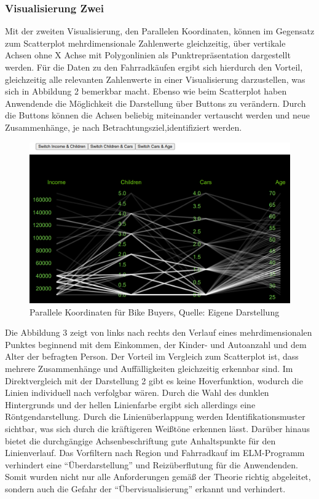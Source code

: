 \documentclass[usegeometry=true]{scrartcl}
\begin{document}
\subsubsection{Visualisierung Zwei}
Mit der zweiten Visualisierung, den Parallelen Koordinaten, können im Gegensatz zum Scatterplot mehrdimensionale Zahlenwerte gleichzeitig, über vertikale Achsen ohne X Achse mit Polygonlinien als Punktrepräsentation dargestellt werden.
Für die Daten zu den Fahrradkäufen ergibt sich hierdurch den Vorteil, gleichzeitig alle relevanten Zahlenwerte in einer Visualisierung darzustellen, was sich in Abbildung 2 bemerkbar macht. Ebenso wie beim Scatterplot haben Anwendende die Möglichkeit die Darstellung über Buttons zu verändern. Durch die Buttons können die Achsen beliebig miteinander vertauscht werden und neue Zusammenhänge, je nach Betrachtungsziel,identifiziert werden. 
\begin{figure}[h]
\begin{center}
\includegraphics[width=16cm]{Bilder/V2ParalleleKoordinaten.png}
\caption{Parallele Koordinaten für Bike Buyers, Quelle: Eigene Darstellung}
\end{center}
\end{figure}
\newline
Die Abbildung 3 zeigt von links nach rechts den Verlauf eines mehrdimensionalen Punktes beginnend mit dem Einkommen, der Kinder- und Autoanzahl und dem Alter der befragten Person. Der Vorteil im Vergleich zum Scatterplot ist, dass mehrere Zusammenhänge und Auffälligkeiten gleichzeitig erkennbar sind. Im Direktvergleich mit der Darstellung 2 gibt es keine Hoverfunktion, wodurch die Linien individuell nach verfolgbar wären. Durch die Wahl des dunklen Hintergrunds und der hellen Linienfarbe ergibt sich allerdings eine Röntgendarstellung. Durch die Linienüberlappung werden Identifikationsmuster sichtbar, was sich durch die kräftigeren Weißtöne erkennen lässt. Darüber hinaus bietet die durchgängige Achsenbeschriftung gute Anhaltspunkte für den Linienverlauf. Das Vorfiltern nach Region und Fahrradkauf im ELM-Programm verhindert eine "`Überdarstellung"' und Reizüberflutung für die Anwendenden.  Somit wurden nicht nur alle Anforderungen gemäß der Theorie richtig abgeleitet, sondern auch die Gefahr der "`Übervisualisierung"' erkannt und verhindert.
\end{document}
